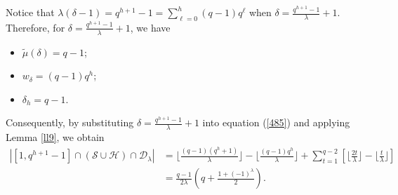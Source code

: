 \documentclass[journal,onecolumn]{IEEEtran}
\begin{document}
Notice that $\lambda( \delta-1)= q^{h+1}-1=\sum\limits_{\ell=0}^h(q-1)q^{\ell}$ when  $\delta=\frac{q^{h+1}-1}{\lambda}+1$. Therefore, for $\delta=\frac{q^{h+1}-1}{\lambda}+1$,  we have 
\begin{itemize}
    \item $\widetilde{\mu}(\delta)=q-1$;
    \item $ w_{\delta}=(q-1)q^h$;
    \item$ \delta_h=q-1.$
\end{itemize} 
Consequently, by substituting  $\delta=\frac{q^{h+1}-1}{\lambda}+1$ into equation (\ref{485}) and  applying Lemma \ref{ll9},  we obtain   
\begin{equation}\label{v7}
\begin{split}
\left|\left[1, q^{h+1}-1\right]\cap (\mathcal{S}\cup \mathcal{H}) \cap \mathcal{D}_{\lambda} \right|&=  \lfloor \frac{(q-1)(q^h+1)}{\lambda}\rfloor-\lfloor \frac{(q-1)q^{h}}{\lambda}\rfloor + \sum\limits_{t=1}^{q-2}\left[ \lfloor \frac{2t}{\lambda}\rfloor -\lfloor \frac{t}{\lambda}\rfloor \right]\\
& = 
\frac{q-1}{2\lambda}\left(q+\frac{1+(-1)^{\lambda
}}{2}\right).
\end{split}
\end{equation}
\end{document}
